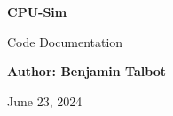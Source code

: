 \begin{titlepage}
    \begin{center}
        \vspace*{1cm}

        \LARGE
        \textbf{CPU-Sim}

        \vspace{0.5cm}
        \Large
        Code Documentation
        
        \vspace{2cm}

        \textbf{Author: Benjamin Talbot}
        
        \vspace{0.5cm}
        June 23, 2024


    \end{center}
\end{titlepage}